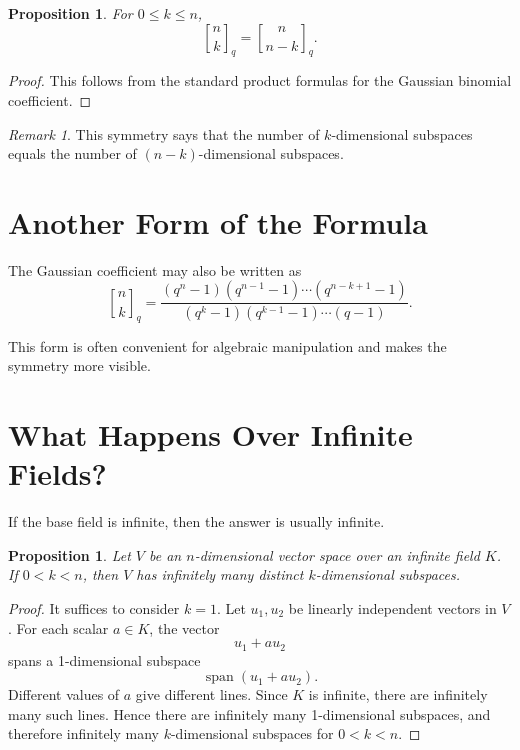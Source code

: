 \documentclass[11pt]{article}
\newtheorem{proposition}[theorem]{Proposition}
\theoremstyle{definition}
\theoremstyle{remark}
\newtheorem{remark}[theorem]{Remark}
\newcommand{\Span}{\operatorname{span}}
\newcommand{\qbinom}[2]{\genfrac{[}{]}{0pt}{}{#1}{#2}_q}
\begin{document}
	\begin{proposition}
		For \(0\le k\le n\),
		\[
		\qbinom{n}{k}=\qbinom{n}{n-k}.
		\]
	\end{proposition}
	
	\begin{proof}
		This follows from the standard product formulas for the Gaussian binomial coefficient.
	\end{proof}
	
	\begin{remark}
		This symmetry says that the number of \(k\)-dimensional subspaces equals the number of \((n-k)\)-dimensional subspaces.
	\end{remark}
	
	\section{Another Form of the Formula}
	
	The Gaussian coefficient may also be written as
	\[
	\qbinom{n}{k}
	=
	\frac{(q^n-1)(q^{n-1}-1)\cdots(q^{n-k+1}-1)}
	{(q^k-1)(q^{k-1}-1)\cdots(q-1)}.
	\]
	
	This form is often convenient for algebraic manipulation and makes the symmetry more visible.
	
	\section{What Happens Over Infinite Fields?}
	
	If the base field is infinite, then the answer is usually infinite.
	
	\begin{proposition}
		Let \(V\) be an \(n\)-dimensional vector space over an infinite field \(K\). If \(0<k<n\), then \(V\) has infinitely many distinct \(k\)-dimensional subspaces.
	\end{proposition}
	
	\begin{proof}
		It suffices to consider \(k=1\). Let \(u_1,u_2\) be linearly independent vectors in \(V\). For each scalar \(a\in K\), the vector
		\[
		u_1+au_2
		\]
		spans a 1-dimensional subspace
		\[
		\Span(u_1+au_2).
		\]
		Different values of \(a\) give different lines. Since \(K\) is infinite, there are infinitely many such lines. Hence there are infinitely many 1-dimensional subspaces, and therefore infinitely many \(k\)-dimensional subspaces for \(0<k<n\).
	\end{proof}
	
\end{document}
